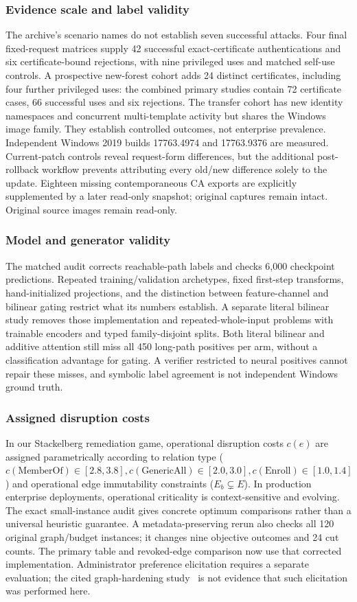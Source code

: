 \subsubsection{Evidence scale and label validity}
 The archive's scenario names do not establish seven successful attacks. Four final fixed-request matrices supply 42 successful exact-certificate authentications and six certificate-bound rejections, with nine privileged uses and matched self-use controls. A prospective new-forest cohort adds 24 distinct certificates, including four further privileged uses: the combined primary studies contain 72 certificate cases, 66 successful uses and six rejections. The transfer cohort has new identity namespaces and concurrent multi-template activity but shares the Windows image family. They establish controlled outcomes, not enterprise prevalence. Independent Windows 2019 builds 17763.4974 and 17763.9376 are measured. Current-patch controls reveal request-form differences, but the additional post-rollback workflow prevents attributing every old/new difference solely to the update. Eighteen missing contemporaneous CA exports are explicitly supplemented by a later read-only snapshot; original captures remain intact. Original source images remain read-only.
\subsubsection{Model and generator validity}
 The matched audit corrects reachable-path labels and checks 6,000 checkpoint predictions. Repeated training/validation archetypes, fixed first-step transforms, hand-initialized projections, and the distinction between feature-channel and bilinear gating restrict what its numbers establish. A separate literal bilinear study removes those implementation and repeated-whole-input problems with trainable encoders and typed family-disjoint splits. Both literal bilinear and additive attention still miss all 450 long-path positives per arm, without a classification advantage for gating. A verifier restricted to neural positives cannot repair these misses, and symbolic label agreement is not independent Windows ground truth.
\subsubsection{Assigned disruption costs}
 In our Stackelberg remediation game, operational disruption costs $c(e)$ are assigned parametrically according to relation type ($c(\text{MemberOf}) \in [2.8, 3.8], c(\text{GenericAll}) \in [2.0, 3.0], c(\text{Enroll}) \in [1.0, 1.4]$) and operational edge immutability constraints ($E_b \subsetneq E$). In production enterprise deployments, operational criticality is context-sensitive and evolving. The exact small-instance audit gives concrete optimum comparisons rather than a universal heuristic guarantee. A metadata-preserving rerun also checks all 120 original graph/budget instances; it changes nine objective outcomes and 24 cut counts. The primary table and revoked-edge comparison now use that corrected implementation. Administrator preference elicitation requires a separate evaluation; the cited graph-hardening study~\cite{goel2024hardening} is not evidence that such elicitation was performed here.
